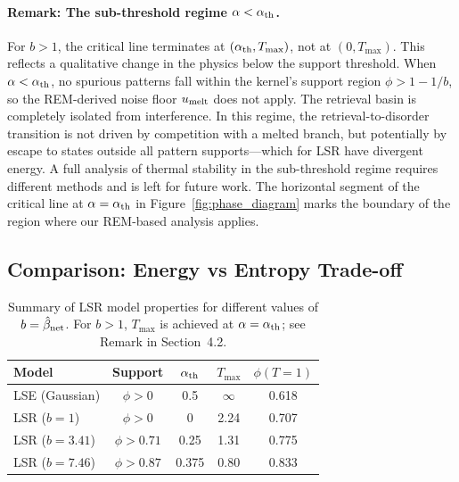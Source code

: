 \documentclass{article}
\theoremstyle{plain}
\theoremstyle{definition}
\theoremstyle{remark}
\begin{document}
\paragraph{Remark: The sub-threshold regime $\alpha < \alpha_{\rm th}$.} For $b > 1$, the critical line terminates at $(\alpha_{\rm th}, T_{\max})$, not at $(0, T_{\max})$. This reflects a qualitative change in the physics below the support threshold. When $\alpha < \alpha_{\rm th}$, no spurious patterns fall within the kernel's support region $\phi > 1 - 1/b$, so the REM-derived noise floor $u_{\rm melt}$ does not apply. The retrieval basin is completely isolated from interference. In this regime, the retrieval-to-disorder transition is not driven by competition with a melted branch, but potentially by escape to states outside all pattern supports---which for LSR have divergent energy. A full analysis of thermal stability in the sub-threshold regime requires different methods and is left for future work. The horizontal segment of the critical line at $\alpha = \alpha_{\rm th}$ in Figure~\ref{fig:phase_diagram} marks the boundary of the region where our REM-based analysis applies.

\subsection{Comparison: Energy vs Entropy Trade-off}

\begin{table}[t]
\caption{Summary of LSR model properties for different values of $b = \hat{\beta}_{\rm net}$. For $b > 1$, $T_{\max}$ is achieved at $\alpha = \alpha_{\rm th}$; see Remark in Section~4.2.}
\label{tab:lsr_b_values}
\vskip 0.1in
\begin{center}
\begin{small}
\begin{tabular}{lcccc}
\toprule
Model & Support & $\alpha_{\rm th}$ & $T_{\max}$ & $\phi(T\!=\!1)$ \\
\midrule
LSE (Gaussian) & $\phi > 0$ & 0.5 & $\infty$ & 0.618 \\
LSR ($b = 1$) & $\phi > 0$ & 0 & 2.24 & 0.707 \\
LSR ($b = 3.41$) & $\phi > 0.71$ & 0.25 & 1.31 & 0.775 \\
LSR ($b = 7.46$) & $\phi > 0.87$ & 0.375 & 0.80 & 0.833 \\
\bottomrule
\end{tabular}
\end{small}
\end{center}
\end{table}
\end{document}
